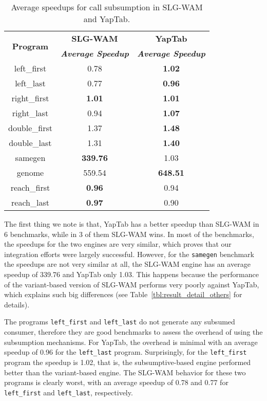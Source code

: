 \begin{table}[ht]
\centering
  \begin{tabular}{ccc}
   \hline
    \hline
    \multirow{2}{*}{\textbf{Program}} & \textbf{SLG-WAM} & \textbf{YapTab} \\
    & \textbf{\textit{\small{Average Speedup}}} & \textbf{\textit{\small{Average Speedup}}} \\
   \hline
   \hline
left\_first & 0.78 & \textbf{1.02} \\
left\_last & 0.77  & \textbf{0.96} \\
right\_first & \textbf{1.01} & \textbf{1.01} \\
right\_last & 0.94 & \textbf{1.07} \\
double\_first & 1.37 & \textbf{1.48} \\
double\_last & 1.31 & \textbf{1.40} \\
samegen & \textbf{339.76} & 1.03 \\
genome & 559.54 & \textbf{648.51} \\
reach\_first  & \textbf{0.96} & 0.94 \\
reach\_last  & \textbf{0.97} & 0.90 \\
\hline
\hline
\end{tabular}
\caption{Average speedups for call subsumption in SLG-WAM and YapTab.}
\label{tbl:results_overview}
\end{table}

The first thing we note is that,  YapTab has a better speedup than SLG-WAM in 6 benchmarks, while in 3 of
them SLG-WAM wins. In most of the benchmarks, the speedups for the two engines are very similar, which proves
that our integration efforts were  largely successful. However, for the \texttt{samegen} benchmark the
speedups are not very similar at all, the SLG-WAM engine has an average speedup of 339.76
and YapTab only 1.03. This happens because the performance of the variant-based version of SLG-WAM
performs very poorly against YapTab, which explains such big differences (see Table~\ref{tbl:result_detail_others}
for details).

The programs \texttt{left\_first} and \texttt{left\_last} do not generate any subsumed consumer,
therefore they are good benchmarks to assess the overhead of using the subsumption mechanisms. For YapTab,
the overhead is minimal with an average speedup of 0.96 for the \texttt{left\_last} program. Surprisingly, for the
\texttt{left\_first} program the speedup is 1.02, that is, the subsumptive-based engine performed better
than the variant-based engine. The SLG-WAM behavior for these two programs is clearly worst, with an average
speedup of 0.78 and 0.77 for \texttt{left\_first} and \texttt{left\_last}, respectively.

